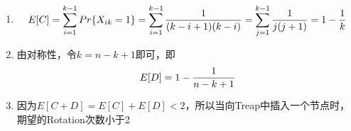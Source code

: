 \begin{enumerate}
	\item	\begin{equation} \notag
			E[C] = \sum_{i = 1}^{k - 1} Pr\{X_{ik} = 1\} = \sum_{i = 1}^{k - 1} \frac{1}{(k - i + 1)(k - i)} = \sum_{j = 1}^{k - 1} \frac{1}{j(j + 1)} = 1 - \frac{1}{k}
		\end{equation}
	\item	由对称性，令$k = n - k + 1$即可，即
		\begin{equation} \notag
			E[D] = 1 - \frac{1}{n - k + 1}
		\end{equation}
	\item	因为$E[C + D] = E[C] + E[D] < 2$，所以当向Treap中插入一个节点时，期望的Rotation次数小于2
\end{enumerate}

